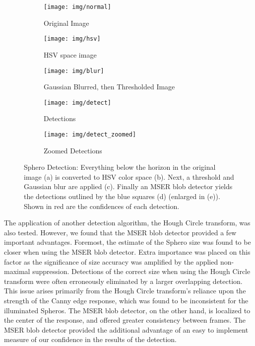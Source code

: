 \begin{figure}[!ht]
	\centering
	\begin{subfigure}[b]{0.4\textwidth}
		\texttt{[image: img/normal]}
		\caption{Original Image}
	\end{subfigure}

	\begin{subfigure}[b]{0.4\textwidth}
		\texttt{[image: img/hsv]}
		\caption{HSV space image}
	\end{subfigure}

	\begin{subfigure}[b]{0.4\textwidth}
		\texttt{[image: img/blur]}
		\caption{Gaussian Blurred, then Thresholded Image}
	\end{subfigure}

	\begin{subfigure}[b]{0.4\textwidth}
		\texttt{[image: img/detect]}
		\caption{Detections}
	\end{subfigure}
	
	\begin{subfigure}[b]{0.4\textwidth}
		\texttt{[image: img/detect\_zoomed]}
		\caption{Zoomed Detections}
	\end{subfigure}
	
	\caption{Sphero Detection: Everything below the horizon in the original image (a) is converted to HSV color space (b). Next,
	a threshold and Gaussian blur are applied (c).  Finally an MSER blob detector yields the detections outlined by the blue
	squares (d) (enlarged in (e)).  Shown in red are the confidences of each detection.}
	\label{fig:blob-results}
\end{figure}

The application of another detection algorithm, the Hough Circle transform, was also tested. However, we found that the MSER
blob detector provided a few important advantages. Foremost, the estimate of the Sphero size was found to be closer when
using the MSER blob detector. Extra importance was placed on this factor as the significance of size accuracy was amplified by
the applied non-maximal suppression. Detections of the correct size when using the Hough Circle transform were often
erroneously eliminated by a larger overlapping detection. This issue arises primarily from the Hough Circle transform's reliance
upon the strength of the Canny edge response, which was found to be inconsistent for the illuminated Spheros. The MSER blob
detector, on the other hand, is localized to the center of the response, and offered greater consistency between frames. The
MSER blob detector provided the additional advantage of an easy to implement measure of our confidence in the results of the
detection.

